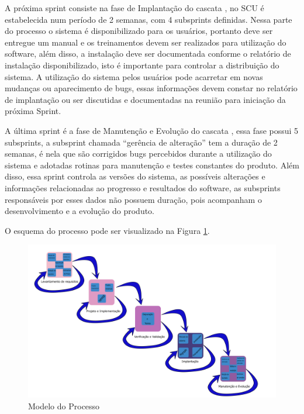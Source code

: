 \documentclass[	DIV=calc,%
							paper=a4,%
							fontsize=12pt,%
							onecolumn]{scrartcl}%
\begin{document}
A próxima sprint consiste na fase de Implantação do cascata \cite{sommervilleengenharia}, no SCU é estabelecida num período de 2 semanas, com 4 subsprints definidas. Nessa parte do processo o sistema é disponibilizado para os usuários, portanto deve ser entregue um manual e os treinamentos devem ser realizados para utilização do software, além disso, a instalação deve ser documentada conforme o relatório de instalação disponibilizado, isto é importante para controlar a distribuição do sistema. A utilização do sistema pelos usuários pode acarretar em novas mudanças ou aparecimento de bugs, essas informações devem constar no relatório de implantação ou ser discutidas e documentadas na reunião para iniciação da próxima Sprint.

A última sprint é a fase de Manutenção e Evolução do cascata \cite{sommervilleengenharia}, essa fase possui 5 subsprints, a subsprint chamada “gerência de alteração” tem a duração de 2 semanas, é nela que são corrigidos bugs percebidos durante a utilização do sistema e adotadas rotinas para manutenção e testes constantes do produto. Além disso, essa sprint controla as versões do sistema, as possíveis alterações e informações relacionadas ao progresso e resultados do software, as subsprints responsáveis por esses dados não possuem duração, pois acompanham o desenvolvimento e a evolução do produto.

O esquema do processo pode ser visualizado na Figura \ref{modelodoprocesso}.

\begin{figure}
\centering
\includegraphics[width=\textwidth]{modelo-do-processo.png}
\caption{Modelo do Processo}
\label{modelodoprocesso}
\end{figure}
\FloatBarrier
\end{document}
